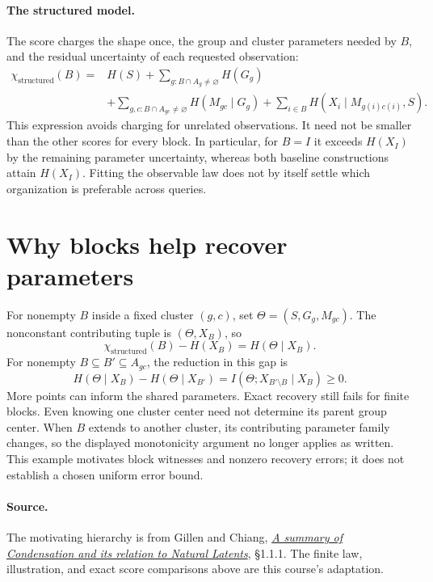 \documentclass[11pt]{article}
\begin{document}
\paragraph{The structured model.}
The score charges the shape once, the group and cluster parameters needed by
$B$, and the residual uncertainty of each requested observation:
\[
\begin{aligned}
 \chi_{\mathrm{structured}}(B)={}&H(S)
 +\sum_{g:B\cap A_g\ne\varnothing}H(G_g)\\
 &+\sum_{g,c:B\cap A_{gc}\ne\varnothing}H(M_{gc}\mid G_g)
 +\sum_{i\in B}H(X_i\mid M_{g(i)c(i)},S).
\end{aligned}
\]
This expression avoids charging for unrelated observations. It need not be
smaller than the other scores for every block. In particular, for $B=I$ it
exceeds $H(X_I)$ by the remaining parameter uncertainty, whereas both baseline
constructions attain $H(X_I)$. Fitting the observable law does not by itself
settle which organization is preferable across queries.

\section{Why blocks help recover parameters}
For nonempty $B$ inside a fixed cluster $(g,c)$, set $\Theta=(S,G_g,M_{gc})$. The
nonconstant contributing tuple is $(\Theta,X_B)$, so
\[
 \chi_{\mathrm{structured}}(B)-H(X_B)=H(\Theta\mid X_B).
\]
For nonempty $B\subseteq B'\subseteq A_{gc}$, the reduction in this gap is
\[
 H(\Theta\mid X_B)-H(\Theta\mid X_{B'})
 =I(\Theta;X_{B'\setminus B}\mid X_B)\ge0.
\]
More points can inform the shared parameters. Exact recovery still fails for
finite blocks. Even knowing one cluster center need not determine its parent
group center. When $B$ extends to another cluster, its contributing parameter
family changes, so the displayed monotonicity argument no longer applies as
written. This example motivates block witnesses and nonzero recovery errors;
it does not establish a chosen uniform error bound.

\paragraph{Source.}
The motivating hierarchy is from Gillen and Chiang,
\href{https://www.alignmentforum.org/posts/agw7HhW4cWjADpBgo}{\emph{A summary of
Condensation and its relation to Natural Latents}}, \S1.1.1. The finite law,
illustration, and exact score comparisons above are this course's adaptation.
\end{document}
